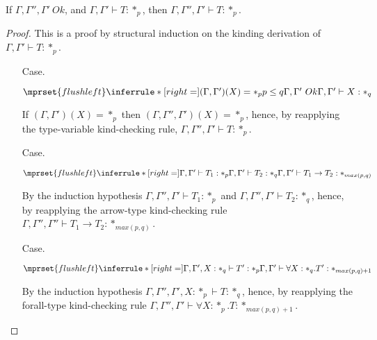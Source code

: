 \begin{lemma}
  If $\Gamma,\Gamma'',\Gamma'\ Ok$, and $\Gamma,\Gamma' \vdash
  T:*_p$, then $\Gamma,\Gamma'',\Gamma' \vdash T:*_p$.
  \label{lemma:context_weakening_for_kinding_ssf}
\end{lemma}
\begin{proof}
  This is a proof by structural induction on the kinding derivation of 
$\Gamma,\Gamma' \vdash T:*_p$.
\begin{itemize}
\item[Case.]\ \\
  \begin{center}
    \begin{math}
      $$\mprset{flushleft}
      \inferrule* [right=] {
        (\Gamma,\Gamma')(X) = *_p
	\\
	p \leq q
	\\
	\Gamma,\Gamma'\ Ok
      }{\Gamma,\Gamma' \vdash X : *_q}
    \end{math}
  \end{center}
  If $(\Gamma,\Gamma')(X) = *_p$ then $(\Gamma,\Gamma'',\Gamma')(X) = *_p$, hence, by 
  reapplying the type-variable kind-checking rule, $\Gamma,\Gamma'',\Gamma' \vdash T:*_p$.
\item[Case.]\ \\
  \begin{center}
    \begin{math}
      $$\mprset{flushleft}
      \inferrule* [right=] {
        \Gamma,\Gamma' \vdash T_1 : *_p
	\\
	\Gamma,\Gamma' \vdash T_2 : *_q
      }{\Gamma,\Gamma' \vdash T_1 \rightarrow T_2 : *_{max(p,q)}}
    \end{math}
  \end{center}
  By the induction hypothesis $\Gamma,\Gamma'',\Gamma' \vdash T_1:*_p$ and 
  $\Gamma,\Gamma'',\Gamma' \vdash T_2:*_q$,
  hence, by reapplying the arrow-type kind-checking rule 
  $\Gamma,\Gamma'',\Gamma'' \vdash T_1 \rightarrow T_2:*_{max(p,q)}$.

\item[Case.]\ \\
  \begin{center}
    \begin{math}
      $$\mprset{flushleft}
      \inferrule* [right=] {
        \Gamma,\Gamma',X : *_q \vdash T' : *_p
      }{\Gamma,\Gamma' \vdash \forall X:*_q.T' : *_{max(p,q)+1}}
    \end{math}
  \end{center}
  By the induction hypothesis $\Gamma,\Gamma'',\Gamma',X:*_p \vdash T:*_q$, hence, by 
  reapplying the forall-type
  kind-checking rule $\Gamma,\Gamma'',\Gamma' \vdash \forall X:*_p.T:*_{max(p,q)+1}$.
\end{itemize}
\end{proof}

